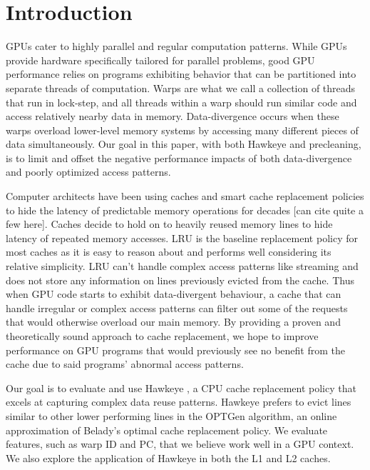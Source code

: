 \chapter{Introduction}

GPUs cater to highly parallel and regular computation patterns. While GPUs provide hardware specifically tailored for parallel problems, good GPU performance relies on programs exhibiting behavior that can be partitioned into separate threads of computation. Warps are what we call a collection of threads that run in lock-step, and all threads within a warp should run similar code and access relatively nearby data in memory. Data-divergence occurs when these warps overload lower-level memory systems by accessing many different pieces of data simultaneously. Our goal in this paper, with both Hawkeye and precleaning, is to limit and offset the negative performance impacts of both data-divergence and poorly optimized access patterns.

Computer architects have been using caches and smart cache replacement policies to hide the latency of predictable memory operations for decades \cite{dip,eva,rrip,} [can cite quite a few here]. Caches decide to hold on to heavily reused memory lines to hide latency of repeated memory accesses. LRU is the baseline replacement policy for most caches as it is easy to reason about and performs well considering its relative simplicity. LRU can’t handle complex access patterns like streaming and does not store any information on lines previously evicted from the cache. Thus when GPU code starts to exhibit data-divergent behaviour, a cache that can handle irregular or complex access patterns can filter out some of the requests that would otherwise overload our main memory. By providing a proven and theoretically sound approach to cache replacement, we hope to improve performance on GPU programs that would previously see no benefit from the cache due to said programs’ abnormal access patterns.

Our goal is to evaluate and use Hawkeye \cite{hawkeye}, a CPU cache replacement policy that excels at capturing complex data reuse patterns. Hawkeye prefers to evict lines similar to other lower performing lines in the OPTGen algorithm, an online approximation of Belady’s optimal cache replacement policy. We evaluate features, such as warp ID and PC, that we believe work well in a GPU context. We also explore the application of Hawkeye in both the L1 and L2 caches.

